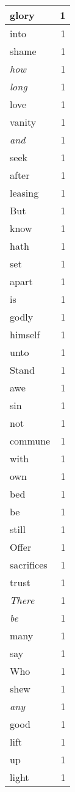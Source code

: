 \begin{center}
\begin{longtable}{l|r}
glory & 1 \\ \hline
into & 1 \\ \hline
shame & 1 \\ \hline
\emph{how} & 1 \\ \hline
\emph{long} & 1 \\ \hline
love & 1 \\ \hline
vanity & 1 \\ \hline
\emph{and} & 1 \\ \hline
seek & 1 \\ \hline
after & 1 \\ \hline
leasing & 1 \\ \hline
But & 1 \\ \hline
know & 1 \\ \hline
hath & 1 \\ \hline
set & 1 \\ \hline
apart & 1 \\ \hline
is & 1 \\ \hline
godly & 1 \\ \hline
himself & 1 \\ \hline
unto & 1 \\ \hline
Stand & 1 \\ \hline
awe & 1 \\ \hline
sin & 1 \\ \hline
not & 1 \\ \hline
commune & 1 \\ \hline
with & 1 \\ \hline
own & 1 \\ \hline
bed & 1 \\ \hline
be & 1 \\ \hline
still & 1 \\ \hline
Offer & 1 \\ \hline
sacrifices & 1 \\ \hline
trust & 1 \\ \hline
\emph{There} & 1 \\ \hline
\emph{be} & 1 \\ \hline
many & 1 \\ \hline
say & 1 \\ \hline
Who & 1 \\ \hline
shew & 1 \\ \hline
\emph{any} & 1 \\ \hline
good & 1 \\ \hline
lift & 1 \\ \hline
up & 1 \\ \hline
light & 1 \\ \hline

\end{longtable}
\end{center}
